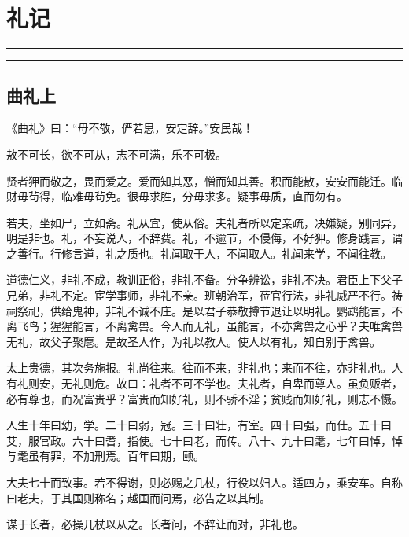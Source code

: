 \documentclass[]{article}
\date{}
\begin{document}
\hypertarget{header-n0}{%
\section{礼记}\label{header-n0}}

\begin{center}\rule{0.5\linewidth}{\linethickness}\end{center}

\tableofcontents

\begin{center}\rule{0.5\linewidth}{\linethickness}\end{center}

\hypertarget{header-n7}{%
\subsection{曲礼上}\label{header-n7}}

《曲礼》曰：``毋不敬，俨若思，安定辞。''安民哉！

敖不可长，欲不可从，志不可满，乐不可极。

贤者狎而敬之，畏而爱之。爱而知其恶，憎而知其善。积而能散，安安而能迁。临财毋茍得，临难毋茍免。很毋求胜，分毋求多。疑事毋质，直而勿有。

若夫，坐如尸，立如斋。礼从宜，使从俗。夫礼者所以定亲疏，决嫌疑，别同异，明是非也。礼，不妄说人，不辞费。礼，不逾节，不侵侮，不好狎。修身践言，谓之善行。行修言道，礼之质也。礼闻取于人，不闻取人。礼闻来学，不闻往教。

道德仁义，非礼不成，教训正俗，非礼不备。分争辨讼，非礼不决。君臣上下父子兄弟，非礼不定。宦学事师，非礼不亲。班朝治军，莅官行法，非礼威严不行。祷祠祭祀，供给鬼神，非礼不诚不庄。是以君子恭敬撙节退让以明礼。鹦鹉能言，不离飞鸟；猩猩能言，不离禽兽。今人而无礼，虽能言，不亦禽兽之心乎？夫唯禽兽无礼，故父子聚麀。是故圣人作，为礼以教人。使人以有礼，知自别于禽兽。

太上贵德，其次务施报。礼尚往来。往而不来，非礼也；来而不往，亦非礼也。人有礼则安，无礼则危。故曰：礼者不可不学也。夫礼者，自卑而尊人。虽负贩者，必有尊也，而况富贵乎？富贵而知好礼，则不骄不淫；贫贱而知好礼，则志不慑。

人生十年曰幼，学。二十曰弱，冠。三十曰壮，有室。四十曰强，而仕。五十曰艾，服官政。六十曰耆，指使。七十曰老，而传。八十、九十曰耄，七年曰悼，悼与耄虽有罪，不加刑焉。百年曰期，颐。

大夫七十而致事。若不得谢，则必赐之几杖，行役以妇人。适四方，乘安车。自称曰老夫，于其国则称名；越国而问焉，必告之以其制。

谋于长者，必操几杖以从之。长者问，不辞让而对，非礼也。
\end{document}
